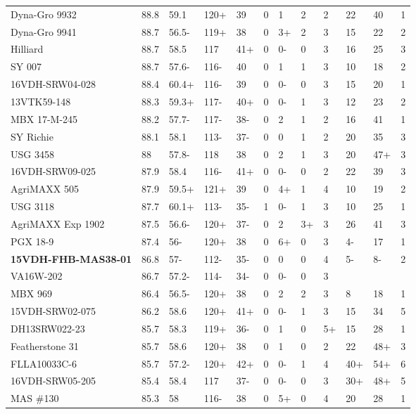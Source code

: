 \documentclass[12pt, letterpaper]{article}
\begin{document}
\begin{landscape}
\begin{ThreePartTable}
\begin{longtable}{llllllllllll}
  Dyna-Gro 9932 & 88.8 & 59.1 & 120+ & 39 & 0 & 1 & 2 & 2 & 22 & 40 & 1 \\ 
  Dyna-Gro 9941 & 88.7 & 56.5- & 119+ & 38 & 0 & 3+ & 2 & 3 & 15 & 22 & 2 \\ 
  Hilliard & 88.7 & 58.5 & 117 & 41+ & 0 & 0- & 0 & 3 & 16 & 25 & 3 \\ 
  SY 007 & 88.7 & 57.6- & 116- & 40 & 0 & 1 & 1 & 3 & 10 & 18 & 2 \\ 
  16VDH-SRW04-028 & 88.4 & 60.4+ & 116- & 39 & 0 & 0- & 0 & 3 & 15 & 20 & 1 \\ 
  13VTK59-148 & 88.3 & 59.3+ & 117- & 40+ & 0 & 0- & 1 & 3 & 12 & 23 & 2 \\ 
  MBX 17-M-245 & 88.2 & 57.7- & 117- & 38- & 0 & 2 & 1 & 2 & 16 & 41 & 1 \\ 
  SY Richie & 88.1 & 58.1 & 113- & 37- & 0 & 0 & 1 & 2 & 20 & 35 & 3 \\ 
  USG 3458 & 88 & 57.8- & 118 & 38 & 0 & 2 & 1 & 3 & 20 & 47+ & 3 \\ 
  16VDH-SRW09-025 & 87.9 & 58.4 & 116- & 41+ & 0 & 0- & 0 & 2 & 22 & 39 & 3 \\ 
  AgriMAXX 505 & 87.9 & 59.5+ & 121+ & 39 & 0 & 4+ & 1 & 4 & 10 & 19 & 2 \\ 
  USG 3118 & 87.7 & 60.1+ & 113- & 35- & 1 & 0- & 1 & 3 & 10 & 25 & 1 \\ 
  AgriMAXX Exp 1902 & 87.5 & 56.6- & 120+ & 37- & 0 & 2 & 3+ & 3 & 26 & 41 & 3 \\ 
  PGX 18-9 & 87.4 & 56- & 120+ & 38 & 0 & 6+ & 0 & 3 & 4- & 17 & 1 \\ 
  \textbf{15VDH-FHB-MAS38-01} & 86.8 & 57- & 112- & 35- & 0 & 0 & 0 & 4 & 5- & 8- & 2 \\ 
  VA16W-202 & 86.7 & 57.2- & 114- & 34- & 0 & 0- & 0 & 3 &  &  &  \\ 
  MBX 969 & 86.4 & 56.5- & 120+ & 38 & 0 & 2 & 2 & 3 & 8 & 18 & 1 \\ 
  15VDH-SRW02-075 & 86.2 & 58.6 & 120+ & 41+ & 0 & 0- & 1 & 3 & 15 & 34 & 5 \\ 
  DH13SRW022-23 & 85.7 & 58.3 & 119+ & 36- & 0 & 1 & 0 & 5+ & 15 & 28 & 1 \\ 
  Featherstone 31 & 85.7 & 58.6 & 120+ & 38 & 0 & 1 & 0 & 2 & 22 & 48+ & 3 \\ 
  FLLA10033C-6 & 85.7 & 57.2- & 120+ & 42+ & 0 & 0- & 1 & 4 & 40+ & 54+ & 6 \\ 
  16VDH-SRW05-205 & 85.4 & 58.4 & 117 & 37- & 0 & 0- & 0 & 3 & 30+ & 48+ & 5 \\ 
  MAS \#130 & 85.3 & 58 & 116- & 38 & 0 & 5+ & 0 & 4 & 20 & 28 & 1 \\ 

\end{longtable}
\end{ThreePartTable}
\end{landscape}
\end{document}

